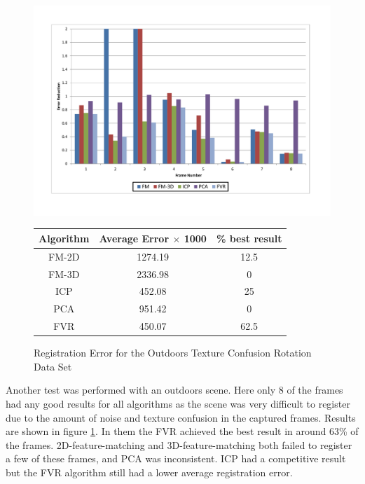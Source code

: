\begin{figure}
\centering
\includegraphics[width=6in]{images/results/Outside_TextureConfusion_Rotation}
\caption{Registration Error for the Outdoors Texture Confusion Rotation Data Set}
\label{fig:PET15}

\begin{tabular}{ccc}
\hline
\textbf{Algorithm} & \textbf{Average Error $\times$ 1000} & \textbf{\% best result}\\ \hline
FM-2D	& 1274.19 & 12.5\\
FM-3D	& 2336.98 & 0\\
ICP		& 452.08 & 25\\
PCA		& 951.42 & 0\\
FVR		& 450.07 & 62.5\\
\end{tabular}
\end{figure}


Another test was performed with an outdoors scene. Here only 8 of the frames had any good results for all algorithms as the scene was very difficult to register due to the amount of noise and texture confusion in the captured frames. Results are shown in figure \ref{fig:PET15}. In them the FVR achieved the best result in around 63\% of the frames. 2D-feature-matching and 3D-feature-matching both failed to register a few of these frames, and PCA was inconsistent. ICP had a competitive result but the FVR algorithm still had a lower average registration error. \\ 


